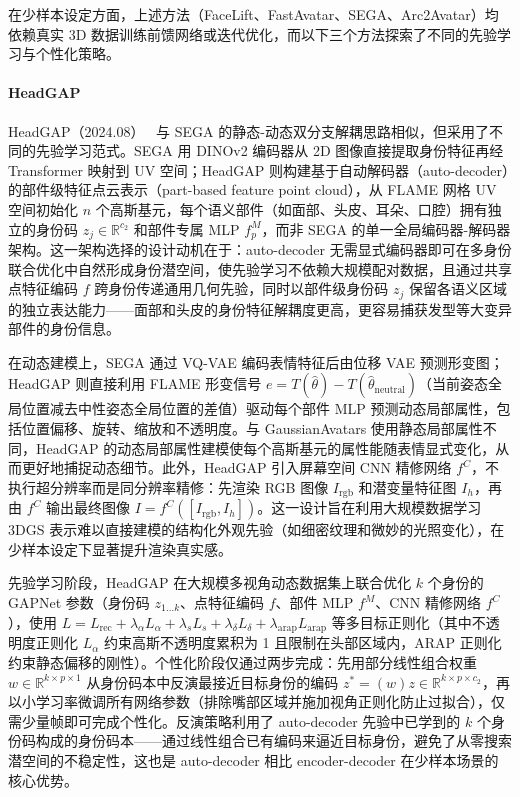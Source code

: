 在少样本设定方面，上述方法（FaceLift、FastAvatar、SEGA、Arc2Avatar）均依赖真实 3D 数据训练前馈网络或迭代优化，而以下三个方法探索了不同的先验学习与个性化策略。

\paragraph{HeadGAP}

HeadGAP（2024.08）~\cite{2408_06019} 与 SEGA 的静态-动态双分支解耦思路相似，但采用了不同的先验学习范式。SEGA 用 DINOv2 编码器从 2D 图像直接提取身份特征再经 Transformer 映射到 UV 空间；HeadGAP 则构建基于自动解码器（auto-decoder）的部件级特征点云表示（part-based feature point cloud），从 FLAME 网格 UV 空间初始化 $n$ 个高斯基元，每个语义部件（如面部、头皮、耳朵、口腔）拥有独立的身份码 $z_j \in \mathbb{R}^{c_2}$ 和部件专属 MLP $f^M_p$，而非 SEGA 的单一全局编码器-解码器架构。这一架构选择的设计动机在于：auto-decoder 无需显式编码器即可在多身份联合优化中自然形成身份潜空间，使先验学习不依赖大规模配对数据，且通过共享点特征编码 $f$ 跨身份传递通用几何先验，同时以部件级身份码 $z_j$ 保留各语义区域的独立表达能力——面部和头皮的身份特征解耦度更高，更容易捕获发型等大变异部件的身份信息。

在动态建模上，SEGA 通过 VQ-VAE 编码表情特征后由位移 VAE 预测形变图；HeadGAP 则直接利用 FLAME 形变信号 $e = T(\hat{\theta}) - T(\hat{\theta}_{\text{neutral}})$（当前姿态全局位置减去中性姿态全局位置的差值）驱动每个部件 MLP 预测动态局部属性，包括位置偏移、旋转、缩放和不透明度。与 GaussianAvatars 使用静态局部属性不同，HeadGAP 的动态局部属性建模使每个高斯基元的属性能随表情显式变化，从而更好地捕捉动态细节。此外，HeadGAP 引入屏幕空间 CNN 精修网络 $f^C$，不执行超分辨率而是同分辨率精修：先渲染 RGB 图像 $I_{\text{rgb}}$ 和潜变量特征图 $I_h$，再由 $f^C$ 输出最终图像 $I = f^C([I_{\text{rgb}}, I_h])$。这一设计旨在利用大规模数据学习 3DGS 表示难以直接建模的结构化外观先验（如细密纹理和微妙的光照变化），在少样本设定下显著提升渲染真实感。

先验学习阶段，HeadGAP 在大规模多视角动态数据集上联合优化 $k$ 个身份的 GAPNet 参数（身份码 $z_{1 \ldots k}$、点特征编码 $f$、部件 MLP $f^M$、CNN 精修网络 $f^C$），使用 $L = L_{\text{rec}} + \lambda_\alpha L_\alpha + \lambda_s L_s + \lambda_\delta L_\delta + \lambda_{\text{arap}} L_{\text{arap}}$ 等多目标正则化（其中不透明度正则化 $L_\alpha$ 约束高斯不透明度累积为 1 且限制在头部区域内，ARAP 正则化约束静态偏移的刚性）。个性化阶段仅通过两步完成：先用部分线性组合权重 $w \in \mathbb{R}^{k \times p \times 1}$ 从身份码本中反演最接近目标身份的编码 $z^* = (w)z \in \mathbb{R}^{k \times p \times c_2}$，再以小学习率微调所有网络参数（排除嘴部区域并施加视角正则化防止过拟合），仅需少量帧即可完成个性化。反演策略利用了 auto-decoder 先验中已学到的 $k$ 个身份码构成的身份码本——通过线性组合已有编码来逼近目标身份，避免了从零搜索潜空间的不稳定性，这也是 auto-decoder 相比 encoder-decoder 在少样本场景的核心优势。

